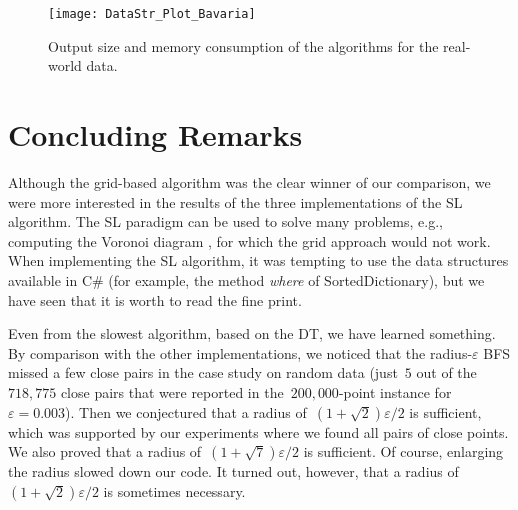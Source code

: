 \begin{figure}[tb]	
	\centering
	\texttt{[image: DataStr\_Plot\_Bavaria]}
	\caption{Output size and memory consumption of the 
	algorithms for the real-world data.
}
\label{fig:DataStr_BavariaMemory}
\end{figure}


\section{Concluding Remarks}\label{sec:DataStr_Conclusion}
Although the grid-based algorithm was the clear winner of our 
comparison, we were more interested in the results of the three 
implementations of the SL algorithm. 
The SL paradigm can be used to solve many problems,
e.g., computing the Voronoi diagram 
\parencite{Fortune1987Voronoi}, 
for which the grid approach would not work. 
When implementing the SL algorithm, 
it was tempting to use the data structures 
available in C\# (for example, the 
method \emph{where} of SortedDictionary), 
but we have seen that it is worth to read the fine print.



Even from the slowest algorithm, based on the DT, 
we have learned something. 
By comparison with the other implementations, 
we noticed that 
the radius-$\varepsilon$ BFS missed a few close pairs 
in the case study on random data 
(just~$5$ out of the~$718{,}775$ close pairs 
that were reported in the~$200{,}000$-point instance 
for~$\varepsilon =0.003$). 
Then we conjectured that 
a radius of~$(1+\sqrt{2})\varepsilon /2$ is sufficient, 
which was supported by our experiments 
where we found all pairs of close points. 
We also proved that 
a radius of~$(1+\sqrt{7})\varepsilon /2$ is sufficient. 
Of course, enlarging the radius slowed down our code. 
It turned out, however, 
that a radius of~$(1+\sqrt{2})\varepsilon /2$ 
is sometimes necessary.



